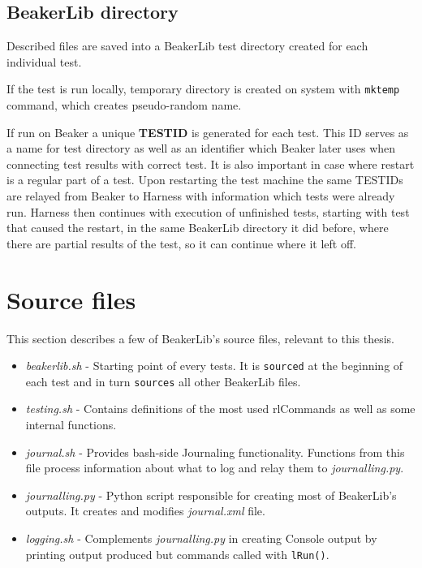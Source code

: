 \subsection{BeakerLib directory}
\label{beakerlib_dir}
Described files are saved into a BeakerLib test directory created for each individual test. 

If the test is run locally, temporary directory is created on system with \texttt{mktemp} command, which creates pseudo-random name.

If run on Beaker a unique \textbf{TESTID} is generated for each test. This ID serves as a name for test directory as well as an identifier which Beaker later uses when connecting test results with correct test. It is also important in case where restart is a regular part of a test. Upon restarting the test machine the same TESTIDs are relayed from Beaker to Harness with information which tests were already run. Harness then continues with execution of unfinished tests, starting with test that caused the restart, in the same BeakerLib directory it did before, where there are partial results of the test, so it can continue where it left off.

\section{Source files}
This section describes a few of BeakerLib's source files, relevant to this thesis.
\begin{itemize}
\item \textit{beakerlib.sh} - Starting point of every tests. It is \texttt{sourced} at the beginning of each test and in turn \texttt{sources} all other BeakerLib files.
\item \textit{testing.sh} - Contains definitions of the most used rlCommands as well as some internal functions.
\item \textit{journal.sh} - Provides bash-side Journaling functionality. Functions from this file process information about what to log and relay them to \textit{journalling.py}.
\item \textit{journalling.py} - Python script responsible for creating most of BeakerLib's outputs. It creates and modifies \textit{journal.xml} file.
\item \textit{logging.sh} - Complements \textit{journalling.py} in creating Console output by printing output produced but commands called with \texttt{lRun()}.
\end{itemize}

